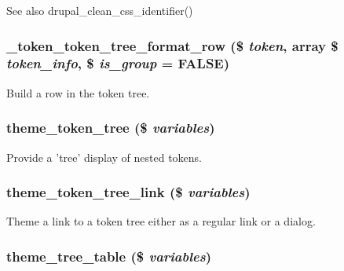 \begin{DoxySeeAlso}{See also}
drupal\_\-clean\_\-css\_\-identifier() 
\end{DoxySeeAlso}
\hypertarget{token_8pages_8inc_ad7895827dd47b9617320c5a9de747ee7}{
\subsubsection[{\_\-token\_\-token\_\-tree\_\-format\_\-row}]{\setlength{\rightskip}{0pt plus 5cm}\_\-token\_\-token\_\-tree\_\-format\_\-row (\$ {\em token}, \/  array \$ {\em token\_\-info}, \/  \$ {\em is\_\-group} = {\ttfamily FALSE})}}
\label{token_8pages_8inc_ad7895827dd47b9617320c5a9de747ee7}
Build a row in the token tree. \hypertarget{token_8pages_8inc_a134bf969c587784a30834201a24284e2}{
\subsubsection[{theme\_\-token\_\-tree}]{\setlength{\rightskip}{0pt plus 5cm}theme\_\-token\_\-tree (\$ {\em variables})}}
\label{token_8pages_8inc_a134bf969c587784a30834201a24284e2}
Provide a 'tree' display of nested tokens. \hypertarget{token_8pages_8inc_a111e8ee04e4553f7c6bd04732a175435}{
\subsubsection[{theme\_\-token\_\-tree\_\-link}]{\setlength{\rightskip}{0pt plus 5cm}theme\_\-token\_\-tree\_\-link (\$ {\em variables})}}
\label{token_8pages_8inc_a111e8ee04e4553f7c6bd04732a175435}
Theme a link to a token tree either as a regular link or a dialog. \hypertarget{token_8pages_8inc_a27af1c0cde4fa8fd2b1ac04f516e2ca6}{
\subsubsection[{theme\_\-tree\_\-table}]{\setlength{\rightskip}{0pt plus 5cm}theme\_\-tree\_\-table (\$ {\em variables})}}
